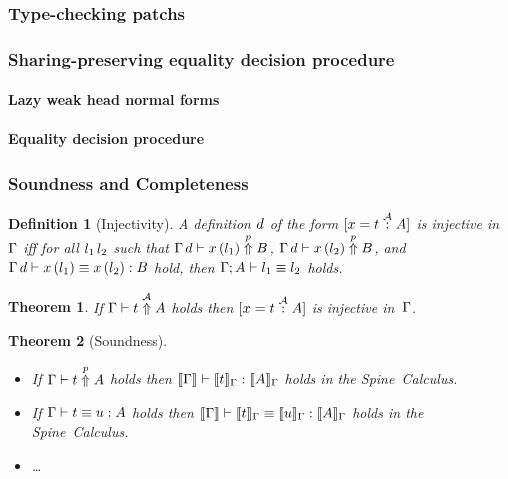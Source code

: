 \documentclass[9pt,authoryear]{sigplanconf}
\newtheorem{theorem}{Theorem}
\newtheorem{definition}{Definition}
\begin{document}
\subsubsection{Type-checking patchs}


\subsubsection{Sharing-preserving equality decision procedure}

\paragraph{Lazy weak head normal forms}


\paragraph{Equality decision procedure}


\subsubsection{Soundness and Completeness}

\begin{definition}[Injectivity]
A definition $d$ of the form $[x = t \stackrel{\mathcal{A}}{:} A]$ is injective
in $\Gamma$ iff for all $l_1\,l_2$ such that
$\Gamma \, d \vdash x\,(l_1) \stackrel{p}{\Uparrow} B$,
$\Gamma \, d \vdash x\,(l_2) \stackrel{p}{\Uparrow} B$, and
$\Gamma \, d \vdash x\,(l_1) \equiv x\,(l_2) : B$
hold, then $\Gamma; A \vdash l_1 \equiv l_2$ holds. 
\end{definition}

\begin{theorem}
If $\Gamma \vdash t \stackrel{\mathcal{A}}{\Uparrow} A$ holds then $[x = t \stackrel{\mathcal{A}}{:} A]$ is
injective in~$\Gamma$.
\end{theorem}

\begin{theorem}[Soundness]\ \\[-1em]
\begin{itemize}
\item  If $\Gamma \vdash t \stackrel{p}{\Uparrow} A$ holds then 
$\llbracket \Gamma \rrbracket \vdash \llbracket t \rrbracket_{\Gamma} : \llbracket A \rrbracket_{\Gamma}$
holds in the Spine~Calculus. 
\item If $\Gamma \vdash t \equiv u : A$ holds then
$\llbracket \Gamma \rrbracket \vdash \llbracket t \rrbracket_{\Gamma} \equiv \llbracket u \rrbracket_{\Gamma} : \llbracket A \rrbracket_{\Gamma}$
holds in the Spine~Calculus. 
\item \ldots
\end{itemize}
\end{theorem}
\end{document}
